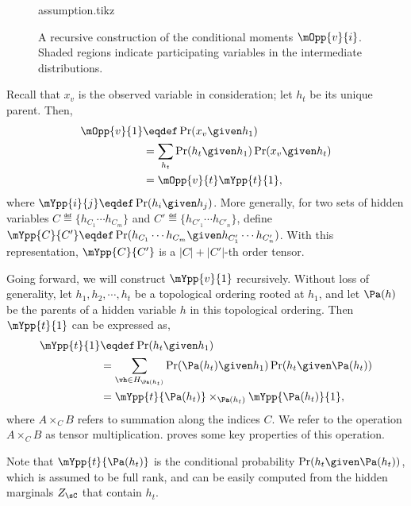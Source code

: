 \begin{figure}[t]
  \label{fig:message-proof}
  \centering
  {assumption.tikz}
  \caption{A recursive construction of the conditional moments $\mOpp{v}{i}$. Shaded regions indicate participating variables in the intermediate distributions.}
\end{figure}

Recall that $x_v$ is the observed variable in consideration; let $h_t$
be its unique parent. Then, 
\begin{align}
  \mOpp{v}{1} &\eqdef \Pr( x_v \given h_1 ) \nonumber \\
              &= \sum_{h_t}  \Pr( h_t \given h_1 ) \Pr( x_v \given h_t ) \nonumber\\
              &= \mOpp{v}{t} \mYpp{t}{1}, \label{eqn:expanding-O}
\end{align}
where $\mYpp{i}{j} \eqdef \Pr( h_i \given h_j )$. 
More generally, for two sets of hidden variables $C \eqdef \{h_{C_1}
\cdots h_{C_m} \}$ and $C' \eqdef \{h_{C'_1} \cdots h_{C'_n} \}$, 
define $\mYpp{C}{C'} \eqdef \Pr( h_{C_1} \cdots h_{C_m} \given h_{C'_1}
\cdots h_{C'_n} )$. 
With this representation, $\mYpp{C}{C'}$ is a $|C| + |C'|$-th order
tensor.
  
Going forward, we will construct $\mYpp{v}{1}$ recursively.
Without loss of generality, let $h_1, h_2, \cdots, h_t$ be a topological
  ordering rooted at $h_1$,
and let $\Pa(h)$ be the parents of a hidden variable $h$ in
  this topological ordering.
Then $\mYpp{t}{1}$ can be expressed as,
\begin{align*}
  \mYpp{t}{1} &\eqdef \Pr( h_t \given h_1 )  \\
  &= \sum_{\vh \in H_{\Pa(h_t)}} \Pr( \Pa(h_t) \given h_1 ) \Pr( h_t \given \Pa(h_t) ) \\
  &= \mYpp{t}{\Pa(h_t)} \times_{\Pa(h_t)} \mYpp{ \Pa(h_t) }{1},
\end{align*}
where $A \times_{C} B$ refers to summation along the indices $C$. We
refer to the operation $A \times_C B$ as tensor multiplication.
 proves some key properties of this
operation. 

Note that $\mYpp{t}{\Pa(h_t)}$ is the conditional probability $\Pr(h_t
 \given \Pa(h_t))$, which is assumed to be full rank, and can be easily
 computed from the hidden marginals $Z_\sC$ that contain $h_t$. 

